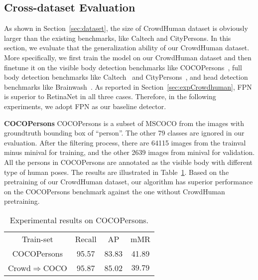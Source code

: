 \documentclass[10pt,twocolumn,letterpaper]{article}
\newcommand{\myparagraph}[1]{{\vspace{0.5em} \noindent \bf #1}}
\begin{document}
\subsection{Cross-dataset Evaluation}\label{exp:crossdataset}

As shown in Section~\ref{sec:dataset}, the size of CrowdHuman dataset is obviously larger than the existing benchmarks, like Caltech and CityPersons. In this section, we evaluate that the generalization ability of our CrowdHuman dataset. More specifically, we first train the model on our CrowdHuman dataset and then finetune it on the visible body detection benchmarks like COCOPersons~\cite{lin2014microsoft}, full body detection benchmarks like Caltech~\cite{dollar2009pedestrian} and CityPersons~\cite{zhang2017citypersons}, and head detection benchmarks like Brainwash~\cite{stewart2016end}. As reported in Section~\ref{sec:expCrowdhuman}, FPN is superior to RetinaNet in all three cases. Therefore, in the following experiments, we adopt FPN as our baseline detector.


\myparagraph{COCOPersons} COCOPersons is a subset of MSCOCO from the images with groundtruth bounding box of ``person''. The other 79 classes are ignored in our evaluation. After the filtering process, there are 64115 images from the trainval minus minival for training, and the other 2639 images from minival for validation. All the persons in COCOPersons are annotated as the visible body with different type of human poses. The results are illustrated in Table~\ref{table:cocoperson}. Based on the pretraining of our CrowdHuman dataset, our algorithm has superior performance on the COCOPersons benchmark against the one without CrowdHuman pretraining. 

\setlength{\tabcolsep}{4pt}
\begin{table}
\begin{center}
\caption{Experimental results on COCOPersons.}
\label{table:cocoperson}
\begin{tabular}{cccc}
\hline\noalign{\smallskip}
{Train-set} & Recall & AP & mMR\\
\noalign{\smallskip}
\hline
\noalign{\smallskip}
COCOPersons & {95.57}  & {83.83} & {41.89}\\
Crowd$\Rightarrow$COCO & {95.87}  & {85.02} & {$\mathbf{39.79}$}\\
\hline
\end{tabular}
\end{center}
\end{table}
\setlength{\tabcolsep}{1.4pt}
\end{document}
